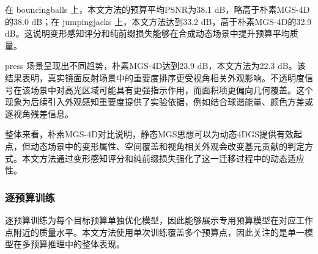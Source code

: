 \documentclass[sn-mathphys]{sn-jnl}
\begin{document}
在 bouncingballs 上，本文方法的预算平均PSNR为38.1 dB，略高于朴素MGS-4D的38.0 dB；在 jumpingjacks 上，本文方法达到33.2 dB，高于朴素MGS-4D的32.9 dB。这说明变形感知评分和纯前缀损失能够在合成动态场景中提升预算平均质量。

press 场景呈现出不同趋势，朴素MGS-4D达到23.9 dB，本文方法为22.3 dB。该结果表明，真实镜面反射场景中的重要度排序更受视角相关外观影响。不透明度信号在该场景中对高光区域可能具有更强指示作用，而面积项更偏向几何覆盖。这个现象为后续引入外观感知重要度提供了实验依据，例如结合球谐能量、颜色方差或逐视角残差信息。

整体来看，朴素MGS-4D对比说明，静态MGS思想可以为动态4DGS提供有效起点，但动态场景中的变形属性、空间覆盖和视角相关外观会改变基元贡献的判定方式。本文方法通过变形感知评分和纯前缀损失强化了这一迁移过程中的动态适应性。

\subsubsection{逐预算训练}

逐预算训练为每个目标预算单独优化模型，因此能够展示专用预算模型在对应工作点附近的质量水平。本文方法使用单次训练覆盖多个预算点，因此关注的是单一模型在多预算推理中的整体表现。
\end{document}
